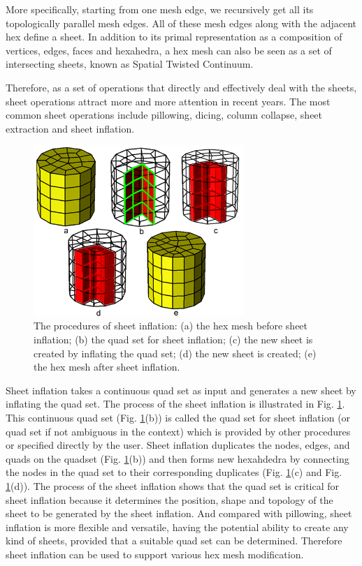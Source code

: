 \documentclass[final,5p,times,twocolumn]{elsarticle}
\begin{document}
More specifically, starting from one mesh edge, we recursively get all its topologically parallel mesh edges. All of these mesh edges along with the adjacent hex define a sheet. In addition to its primal representation as a composition of vertices, edges, faces and hexahedra, a hex mesh can also be seen as a set of intersecting sheets, known as Spatial Twisted Continuum\cite{Murdoch:1997fy}.

Therefore, as a set of operations that directly and effectively deal with the sheets, sheet operations attract more and more attention in recent years. The most common sheet operations include pillowing\cite{Mitchell:1995wa}, dicing\cite{melander1997generation}, column collapse\cite{Staten:2009bo}, sheet extraction\cite{Staten:2009bo,Borden:2002hs} and sheet inflation\cite{Staten:2009bo,Ledoux:2009jz,staten2010sheet}.

\begin{figure}[htbp]
\begin{center}
\includegraphics[width=8cm]{sheet_inflation.png}
\caption{The procedures of sheet inflation: (a) the hex mesh before sheet inflation; (b) the quad set for sheet inflation; (c) the new sheet is created by inflating the quad set; (d) the new sheet is created; (e) the hex mesh after sheet inflation.}
\label{fig:sheet_inflation}
\end{center}
\end{figure}

Sheet inflation takes a continuous quad set as input and generates a new sheet by inflating the quad set. The process of the sheet inflation is illustrated in Fig. \ref{fig:sheet_inflation}. This continuous quad set (Fig. \ref{fig:sheet_inflation}(b)) is called the quad set for sheet inflation (or quad set if not ambiguous in the context) which is provided by other procedures or specified directly by the user. Sheet inflation duplicates the nodes, edges, and quads on the quadset (Fig. \ref{fig:sheet_inflation}(b)) and then forms new hexahdedra by connecting the nodes in the quad set to their corresponding duplicates (Fig. \ref{fig:sheet_inflation}(c) and Fig. \ref{fig:sheet_inflation}(d)). The process of the sheet inflation shows that the quad set is critical for sheet inflation because it determines the position, shape and topology of the sheet to be generated by the sheet inflation. And compared with pillowing, sheet inflation is more flexible and versatile, having the potential ability to create any kind of sheets, provided that a suitable quad set can be determined. Therefore sheet inflation can be used to support various hex mesh modification.
\end{document}
